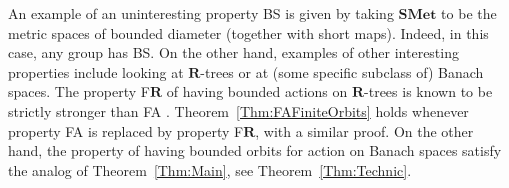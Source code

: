 \documentclass[a4paper]{article}
\theoremstyle{definition}
\newtheorem{rem}[lem]{Remark}
\newcommand*{\field}[1]{\mathbf{#1}}
\newcommand*{\R}{\field{R}}
\begin{document}
%
%
%
An example of an uninteresting property BS is given by taking $\mathbf{SMet}$ to be the metric spaces of bounded diameter (together with short maps). Indeed, in this case, any group has BS.
On the other hand, examples of other interesting properties include looking at $\mathbf{R}$-trees or at (some specific subclass of) Banach spaces.
The property F$\mathbf{R}$ of having bounded actions on $\mathbf{R}$-trees is known to be strictly stronger than FA \cite{MR3465847}. Theorem~\ref{Thm:FAFiniteOrbits} holds whenever property FA is replaced by property F$\mathbf{R}$, with a similar proof.
On the other hand, the property of having bounded orbits for action on Banach spaces satisfy the analog of Theorem~\ref{Thm:Main}, see Theorem~\ref{Thm:Technic}.
\end{document}
